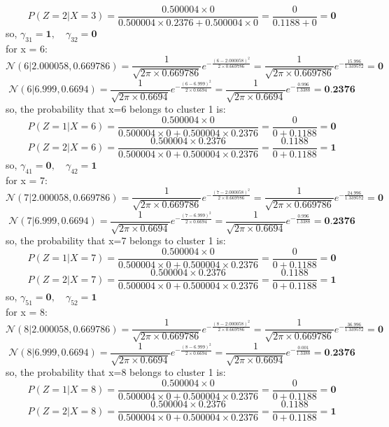 \documentclass{article}
\begin{document}
\begin{enumerate}
\[\]
\[
P(Z = 2 | X = 3) = \frac{0.500004 \times 0}{0.500004 \times 0.2376 + 0.500004 \times 0} = \frac{0}{0.1188 + 0} = \textbf{0}
\]
so, $\gamma_{31} = \textbf{1}, \quad \gamma_{32} = \textbf{0}$
\\ for x = 6:
\[
\mathcal{N}(6 | 2.000058, 0.669786) = \frac{1}{\sqrt{2\pi \times 0.669786}} e^{-\frac{(6-2.000058)^2}{2 \times 0.669786}} = \frac{1}{\sqrt{2\pi \times 0.669786}} e^{-\frac{15.996}{1.339572}} = \textbf{0}
\]
\[
\mathcal{N}(6 | 6.999, 0.6694) = \frac{1}{\sqrt{2\pi \times 0.6694}} e^{-\frac{(6-6.999)^2}{2 \times 0.6694}} = \frac{1}{\sqrt{2\pi \times 0.6694}} e^{-\frac{0.996}{1.3388}} = \textbf{0.2376}
\]
so, the probability that x=6 belongs to cluster 1 is:
\[
P(Z = 1 | X = 6) = \frac{0.500004 \times 0}{0.500004 \times 0 + 0.500004 \times 0.2376} = \frac{0}{0 + 0.1188} = \textbf{0}
\]
\[
P(Z = 2 | X = 6) = \frac{0.500004 \times 0.2376}{0.500004 \times 0 + 0.500004 \times 0.2376} = \frac{0.1188}{0 + 0.1188} = \textbf{1}
\]
so, $\gamma_{41} = \textbf{0}, \quad \gamma_{42} = \textbf{1}$
\\ for x = 7:
\[
\mathcal{N}(7 | 2.000058, 0.669786) = \frac{1}{\sqrt{2\pi \times 0.669786}} e^{-\frac{(7-2.000058)^2}{2 \times 0.669786}} = \frac{1}{\sqrt{2\pi \times 0.669786}} e^{-\frac{24.996}{1.339572}} = \textbf{0}
\]
\[
\mathcal{N}(7 | 6.999, 0.6694) = \frac{1}{\sqrt{2\pi \times 0.6694}} e^{-\frac{(7-6.999)^2}{2 \times 0.6694}} = \frac{1}{\sqrt{2\pi \times 0.6694}} e^{-\frac{0.996}{1.3388}} = \textbf{0.2376}
\]
so, the probability that x=7 belongs to cluster 1 is:
\[
P(Z = 1 | X = 7) = \frac{0.500004 \times 0}{0.500004 \times 0 + 0.500004 \times 0.2376} = \frac{0}{0 + 0.1188} = \textbf{0}
\]
\[
P(Z = 2 | X = 7) = \frac{0.500004 \times 0.2376}{0.500004 \times 0 + 0.500004 \times 0.2376} = \frac{0.1188}{0 + 0.1188} = \textbf{1}
\]
so, $\gamma_{51} = \textbf{0}, \quad \gamma_{52} = \textbf{1}$
\\ for x = 8:
\[
\mathcal{N}(8 | 2.000058, 0.669786) = \frac{1}{\sqrt{2\pi \times 0.669786}} e^{-\frac{(8-2.000058)^2}{2 \times 0.669786}} = \frac{1}{\sqrt{2\pi \times 0.669786}} e^{-\frac{36.996}{1.339572}} = \textbf{0}
\]
\[
\mathcal{N}(8 | 6.999, 0.6694) = \frac{1}{\sqrt{2\pi \times 0.6694}} e^{-\frac{(8-6.999)^2}{2 \times 0.6694}} = \frac{1}{\sqrt{2\pi \times 0.6694}} e^{-\frac{0.001}{1.3388}} = \textbf{0.2376}
\]
so, the probability that x=8 belongs to cluster 1 is:
\[
P(Z = 1 | X = 8) = \frac{0.500004 \times 0}{0.500004 \times 0 + 0.500004 \times 0.2376} = \frac{0}{0 + 0.1188} = \textbf{0}
\]
\[
P(Z = 2 | X = 8) = \frac{0.500004 \times 0.2376}{0.500004 \times 0 + 0.500004 \times 0.2376} = \frac{0.1188}{0 + 0.1188} = \textbf{1}
\]
\end{enumerate}
\end{document}
